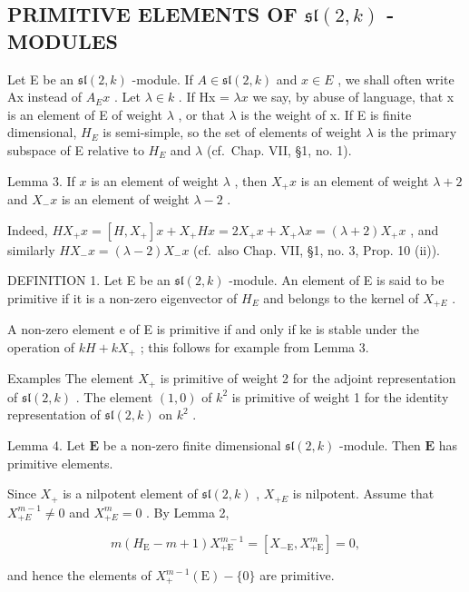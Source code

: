 \subsection{\texorpdfstring{PRIMITIVE ELEMENTS OF \(\mathfrak{sl}(2,k)\) -MODULES}{PRIMITIVE ELEMENTS OF \textbackslash mathfrak\{sl\}(2,k) -MODULES}}

Let E be an \(\mathfrak{sl}(2,k)\) -module. If \(A \in \mathfrak{sl}(2,k)\) and \(x \in E\) , we shall often write Ax instead of \(A_{E}x\) . Let \(\lambda \in k\) . If Hx = \(\lambda x\) we say, by abuse of language, that x is an element of E of weight \(\lambda\) , or that \(\lambda\) is the weight of x. If E is finite dimensional, \(H_{E}\) is semi-simple, so the set of elements of weight \(\lambda\) is the primary subspace of E relative to \(H_{E}\) and \(\lambda\) (cf.~Chap. VII, §1, no. 1).

Lemma 3. If \(x\) is an element of weight \(\lambda\) , then \(X_{+}x\) is an element of weight \(\lambda + 2\) and \(X_{-}x\) is an element of weight \(\lambda - 2\) .

Indeed, \(HX_{+}x = [H,X_{+}]x + X_{+}Hx = 2X_{+}x + X_{+}\lambda x = (\lambda +2)X_{+}x\) , and similarly \(HX_{-}x = (\lambda -2)X_{-}x\) (cf.~also Chap. VII, §1, no. 3, Prop. 10 (ii)).

DEFINITION 1. Let E be an \(\mathfrak{sl}(2,k)\) -module. An element of E is said to be primitive if it is a non-zero eigenvector of \(H_{E}\) and belongs to the kernel of \(X_{+E}\) .

A non-zero element e of E is primitive if and only if ke is stable under the operation of \(kH + kX_{+}\) ; this follows for example from Lemma 3.

Examples The element \(X_{+}\) is primitive of weight 2 for the adjoint representation of \(\mathfrak{sl}(2,k)\) . The element \((1,0)\) of \(k^{2}\) is primitive of weight 1 for the identity representation of \(\mathfrak{sl}(2,k)\) on \(k^{2}\) .

Lemma 4. Let \(\mathbf{E}\) be a non-zero finite dimensional \(\mathfrak{sl}(2,k)\) -module. Then \(\mathbf{E}\) has primitive elements.

Since \(X_{+}\) is a nilpotent element of \(\mathfrak{sl}(2,k)\) , \(X_{+E}\) is nilpotent. Assume that \(X_{+E}^{m-1} \neq 0\) and \(X_{+E}^{m} = 0\) . By Lemma 2,

\[
m (H _ {\mathrm{E}} - m + 1) X _ {+ \mathrm{E}} ^ {m - 1} = [ X _ {- \mathrm{E}}, X _ {+ \mathrm{E}} ^ {m} ] = 0,
\]

and hence the elements of \(X_{+}^{m - 1}(\mathrm{E}) - \{0\}\) are primitive.

